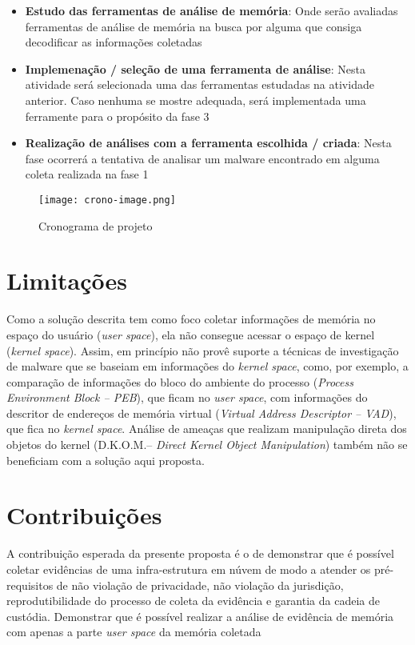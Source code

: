\begin{itemize}
 \item \textbf{Estudo das ferramentas de análise de memória}: Onde serão avaliadas ferramentas de análise de memória na busca por alguma que consiga decodificar as informações coletadas 
 \item \textbf{Implemenação / seleção de uma ferramenta de análise}: Nesta atividade será selecionada uma das ferramentas estudadas na atividade anterior. Caso nenhuma se mostre adequada, será implementada uma ferramente para o propósito da fase 3
 \item \textbf{Realização de análises com a ferramenta escolhida / criada}: Nesta fase ocorrerá a tentativa de analisar um malware encontrado em alguma coleta realizada na fase 1
\end{itemize}

\begin{figure}[htb!]
\footnotesize
\caption{Cronograma de projeto}
\texttt{[image: crono-image.png]}
\centering
\label{fig:cronograma}
\end{figure}

\section{Limitações}
\label{sec:limitacoes}

Como a solução descrita tem como foco coletar informações de memória no espaço do usuário (\textit{user space}), ela não consegue acessar o espaço de kernel (\textit{kernel space}). 
%
Assim, \fancyname em princípio não provê suporte a técnicas de investigação de malware que se baseiam em informações do \textit{kernel space}, como, por exemplo, a comparação de informações do bloco do ambiente do processo (\textit{Process Environment Block -- PEB}), que ficam no \textit{user space}, com informações do descritor de endereços de memória virtual (\textit{Virtual Address Descriptor -- VAD}), que fica no \textit{kernel space}. 
%
Análise de ameaças que realizam manipulação direta dos objetos do kernel (D.K.O.M.-- \textit{Direct Kernel Object Manipulation}) também não se beneficiam com a solução aqui proposta. 

\section{Contribuições}
\label{sec:contribuições}

A contribuição esperada da presente proposta é o de demonstrar que é possível coletar evidências de uma infra-estrutura em núvem de modo a atender os pré-requisitos de não violação de privacidade, não violação da jurisdição, reprodutibilidade do processo de coleta da evidência e garantia da cadeia de custódia.
%
Demonstrar que é possível realizar a análise de evidência de memória com apenas a parte \textit{user space} da memória coletada

